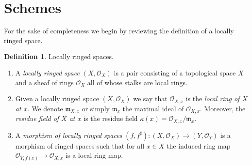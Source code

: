 \documentclass[11pt]{amsart}
\newcommand{\Spec}{{\rm Spec \,}}
\newcommand{\A}{{\mathbb A}}
\newcommand{\C}{{\mathbb C}}
\renewcommand{\P}{{\mathbb P}}
\newcommand{\R}{{\mathbb R}}
\theoremstyle{definition}
\newtheorem{definition}[theorem]{Definition}
\begin{document}
\begin{comment}
Things to say: finite-generation, valuative criteria for $\P^1$ (using DVR's - how giving a point and its specialisation is the same as giving a map $\Spec R\rightarrow \P^1$).\\
List of examples:
\begin{enumerate}
	\item $\A^1$ with a double point (what are quasi-coherent sheaves on this?)
	\item $\A^2\setminus \lbrace 0,0\rbrace$ (what is the structure sheaf?).
	\item $\P^1$ (its structure sheaf!).
	\item $V_{+}(x^2+y^2+z^2)$ over $\R$ and $\C$. The point is that there is a change of coordintes which 
	\item Blow-up of $\A^2$ at a point. (because everyone should know about blow-ups!)
	\item $\Spec R[x_1,x_2,\ldots]$ as an example of something non-noetherian.
	\item An example of a scheme without a closed point.
\end{enumerate}

List of morphisms:
\begin{enumerate}
	\item $x\mapsto x^2$ (more, generally $x^n$). This covers ramified, finitely presented, flat.
	\item a non-quasi-compact open-immersion. Polynomial ring in infinitely many variables and knock off the origin. Also, the origin of is an example of something 
\end{enumerate}
\end{comment}

\section{Schemes}
For the sake of completeness we begin by reviewing the definition of a locally ringed space.

\begin{definition}
	\label{definition-locally-ringed-space}
	Locally ringed spaces.
	\begin{enumerate}
		\item A {\it locally ringed space $(X, \mathcal{O}_X)$}
		is a pair consisting of a
		topological space $X$ and a sheaf of rings $\mathcal{O}_X$ all of whose stalks
		are local rings.
		\item Given a locally ringed space $(X, \mathcal{O}_X)$ we say that
		$\mathcal{O}_{X, x}$ is the {\it local ring of $X$ at $x$}.
		We denote $\mathfrak{m}_{X, x}$ or simply $\mathfrak{m}_x$
		the maximal ideal of $\mathcal{O}_{X, x}$. Moreover, the
		{\it residue field of $X$ at $x$} is the residue field
		$\kappa(x) = \mathcal{O}_{X, x}/\mathfrak{m}_x$.
		\item A {\it morphism of locally ringed spaces}
		$(f, f^\sharp) : (X, \mathcal{O}_X) \to (Y, \mathcal{O}_Y)$
		is a morphism of ringed spaces such that for all $x \in X$
		the induced ring map $\mathcal{O}_{Y, f(x)} \to \mathcal{O}_{X, x}$ is a
		local ring map.
	\end{enumerate}
\end{definition}
\end{document}
